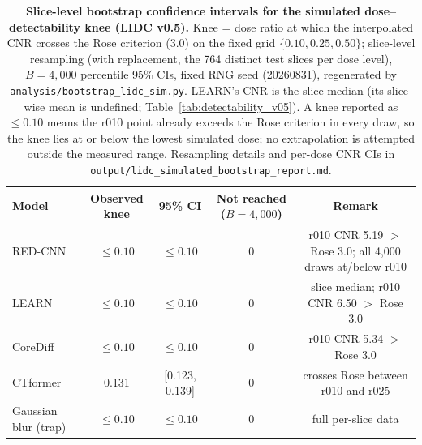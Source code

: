 \documentclass[twoside,11pt]{article}
\begin{document}
\begin{table}[ht]
    \centering
    \small
    \setlength{\tabcolsep}{4pt}
    \begin{tabular}{lcccc}
        \toprule
        \textbf{Model} & \textbf{Observed knee} & \textbf{95\% CI} & \textbf{Not reached ($B=4{,}000$)} & \textbf{Remark} \\
        \midrule
        RED-CNN  & $\le 0.10$ & $\le 0.10$ & 0 & r010 CNR 5.19 $>$ Rose 3.0; all 4{,}000 draws at/below r010 \\
        LEARN    & $\le 0.10$ & $\le 0.10$ & 0 & slice median; r010 CNR 6.50 $>$ Rose 3.0 \\
        CoreDiff & $\le 0.10$ & $\le 0.10$ & 0 & r010 CNR 5.34 $>$ Rose 3.0 \\
        CTformer & 0.131 & [0.123, 0.139] & 0 & crosses Rose between r010 and r025 \\
        Gaussian blur (trap) & $\le 0.10$ & $\le 0.10$ & 0 & full per-slice data \\
        \bottomrule
    \end{tabular}
    \caption{\textbf{Slice-level bootstrap confidence intervals for the simulated dose--detectability knee (LIDC v0.5).} Knee = dose ratio at which the interpolated CNR crosses the Rose criterion (3.0) on the fixed grid $\{0.10, 0.25, 0.50\}$; slice-level resampling (with replacement, the 764 distinct test slices per dose level), $B=4{,}000$ percentile 95\% CIs, fixed RNG seed (20260831), regenerated by \texttt{analysis/bootstrap\_lidc\_sim.py}. LEARN's CNR is the slice median (its slice-wise mean is undefined; Table~\ref{tab:detectability_v05}). A knee reported as $\le 0.10$ means the r010 point already exceeds the Rose criterion in every draw, so the knee lies at or below the lowest simulated dose; no extrapolation is attempted outside the measured range. Resampling details and per-dose CNR CIs in \texttt{output/lidc\_simulated\_bootstrap\_report.md}.}
    \label{tab:lidc_sim_knee_ci}
\end{table}
\end{document}
